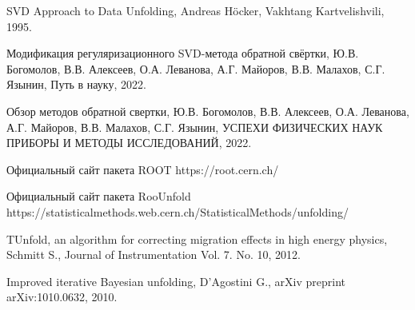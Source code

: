 \documentclass[a4paper,12pt]{diplom}
\begin{document}
\begin{thebibliography}{9}

     SVD Approach to Data Unfolding,
     Andreas Höcker, Vakhtang Kartvelishvili,
     1995.
   
     Модификация регуляризационного SVD-метода обратной свёртки,
     Ю.В. Богомолов, В.В. Алексеев, О.А. Леванова, А.Г. Майоров, В.В. Малахов, С.Г. Язынин,
     Путь в науку,
     2022.

     Обзор методов обратной свертки,
     Ю.В. Богомолов, В.В. Алексеев, О.А. Леванова, А.Г. Майоров, В.В. Малахов, С.Г. Язынин,
     УСПЕХИ ФИЗИЧЕСКИХ НАУК ПРИБОРЫ И МЕТОДЫ ИССЛЕДОВАНИЙ,
     2022.

      Официальный сайт пакета ROOT https://root.cern.ch/

      Официальный сайт пакета RooUnfold \\ https://statisticalmethods.web.cern.ch/StatisticalMethods/unfolding/
   
      TUnfold, an algorithm for correcting migration effects in high energy physics,
      Schmitt S.,
      Journal of Instrumentation Vol. 7. No. 10,
      2012.

      Improved iterative Bayesian unfolding,
      D'Agostini G.,
      arXiv preprint arXiv:1010.0632,
      2010.
   
\end{thebibliography}




\appendix
	
\end{document}
